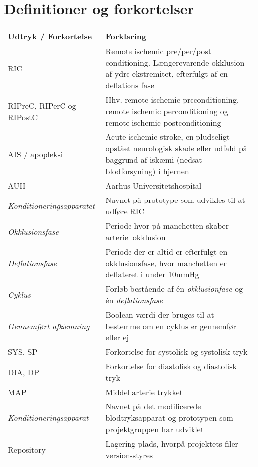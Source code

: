 \chapter*{Definitioner og forkortelser}
	\begin{longtable}{ |p{} |p{}| } 
		\hline
		\textbf{Udtryk / Forkortelse} &  \textbf{Forklaring} \\
		\hline
		RIC & Remote ischemic pre/per/post conditioning. Længerevarende okklusion af ydre ekstremitet, efterfulgt af en deflations fase\\
		\hline
		RIPreC, RIPerC og RIPostC & Hhv. remote ischemic preconditioning, remote ischemic perconditioning og remote ischemic postconditioning\\
		\hline
		AIS / apopleksi & Acute ischemic stroke, en pludseligt opstået neurologisk skade eller udfald på baggrund af iskæmi (nedsat blodforsyning) i hjernen \\
		\hline
		AUH & Aarhus Universitetshospital \\
		\hline
		\textit{Konditioneringsapparatet} & Navnet på prototype som udvikles til at udføre RIC \\
		\hline
		\textit{Okklusionsfase} & Periode hvor på manchetten skaber arteriel okklusion \\
		\hline
		\textit{Deflationsfase} & Periode der er altid er efterfulgt en okklusionsfase, hvor manchetten er deflateret i under 10mmHg\\
		\hline
		\textit{Cyklus} & Forløb bestående af én \textit{okklusionfase} og én \textit{deflationsfase} \\
		\hline
		\textit{Gennemført afklemning} & Boolean værdi der bruges til at bestemme om en cyklus er gennemfør eller ej \\
		\hline
		SYS, SP & Forkortelse for systolisk og systolisk tryk \\
		\hline
		DIA, DP & Forkortelse for diastolisk og diastolisk tryk \\
		\hline
		MAP & Middel arterie trykket \\
		\hline
		\textit{Konditioneringsapparat} & Navnet på det modificerede blodtryksapparat og prototypen som projektgruppen har udviklet \\
		\hline
		Repository & Lagering plads, hvorpå projektets filer versionsstyres \\
		\hline
	\end{longtable}
\newpage